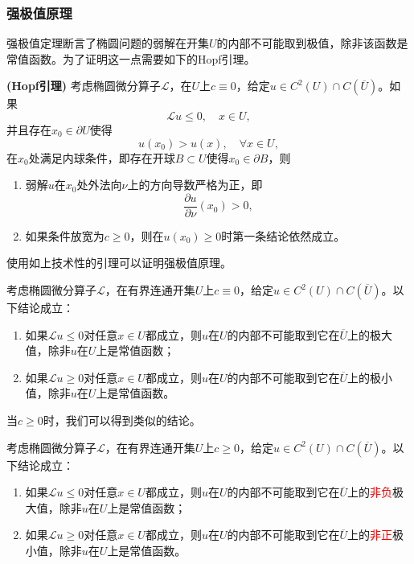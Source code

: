 \documentclass[a4paper,10pt]{ctexart}
\begin{document}
\subsubsection{强极值原理}
强极值定理断言了椭圆问题的弱解在开集$ U $的内部不可能取到极值，除非该函数是常值函数。为了证明这一点需要如下的Hopf引理。
\begin{lemma}{\normalfont\textbf{(Hopf引理)}}
    考虑椭圆微分算子$ \mathcal{L} $，在$ U $上$ c\equiv  0 $，给定$ u\in C^2(U)\cap C(\overline{U}) $。如果
    \[
        \mathcal{L}u \leqslant 0, \quad x\in U,
    \]
    并且存在$ x_0\in \partial U $使得
    \[
        u(x_0) > u(x),\quad \forall x\in U,
    \]
    在$ x_0 $处满足内球条件，即存在开球$ B\subset U $使得$ x_0\in \partial B $，则
    \begin{enumerate}
        \item 弱解$ u $在$ x_0 $处外法向$ \nu $上的方向导数严格为正，即
        \begin{equation}
            \dfrac{\partial u}{\partial \nu}(x_0) >0,
        \end{equation}
        \item 如果条件放宽为$ c\geqslant 0 $，则在$ u(x_0)\geqslant 0 $时第一条结论依然成立。
    \end{enumerate}
\end{lemma}
使用如上技术性的引理可以证明强极值原理。
\begin{theorem}
    考虑椭圆微分算子$ \mathcal{L} $，在有界连通开集$ U $上$ c\equiv 0 $，给定$ u\in C^2(U)\cap C(\overline{U}) $。以下结论成立：
    \begin{enumerate}
        \item 如果$ \mathcal{L}u\leqslant 0 $对任意$ x\in U $都成立，则$ u $在$ U $的内部不可能取到它在$ \overline{U} $上的极大值，除非$ u $在$ U $上是常值函数；
        \item 如果$ \mathcal{L}u\geqslant 0 $对任意$ x\in U $都成立，则$ u $在$ U $的内部不可能取到它在$ \overline{U} $上的极小值，除非$ u $在$ U $上是常值函数。
    \end{enumerate}
\end{theorem}
当$ c\geqslant 0 $时，我们可以得到类似的结论。
\begin{theorem}
    考虑椭圆微分算子$ \mathcal{L} $，在有界连通开集$ U $上$ c\geqslant 0 $，给定$ u\in C^2(U)\cap C(\overline{U}) $。以下结论成立：
    \begin{enumerate}
        \item 如果$ \mathcal{L}u\leqslant 0 $对任意$ x\in U $都成立，则$ u $在$ U $的内部不可能取到它在$ \overline{U} $上的\textcolor{red}{非负}极大值，除非$ u $在$ U $上是常值函数；
        \item 如果$ \mathcal{L}u\geqslant 0 $对任意$ x\in U $都成立，则$ u $在$ U $的内部不可能取到它在$ \overline{U} $上的\textcolor{red}{非正}极小值，除非$ u $在$ U $上是常值函数。
    \end{enumerate}
\end{theorem}
\end{document}
